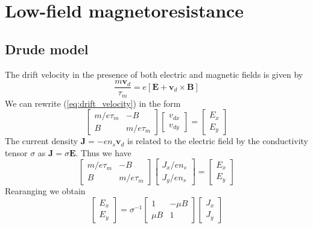 \documentclass[11pt,a4paper]{book}
\theoremstyle{plain}
\theoremstyle{definition}
\theoremstyle{remark}
\renewcommand{\vec}[1]{\boldsymbol{#1}}
\begin{document}
\section{Low-field magnetoresistance}
\subsection{Drude model}
The drift velocity in the presence of both electric and magnetic fields is given by
\begin{equation} \label{eq:drift_velocity}
    \frac{m\vec{v}_d}{\tau_m} = e\left[\vec{E} + \vec{v}_d \times \vec{B}\right]
\end{equation}
We can rewrite (\ref{eq:drift_velocity}) in the form
\begin{equation}
    \begin{bmatrix}
        m/e\tau_m & -B \\
        B & m/e\tau_m
    \end{bmatrix}
    \begin{bmatrix}
        v_{dx} \\ v_{dy}
    \end{bmatrix}
    =
    \begin{bmatrix}
        E_x \\ E_y
    \end{bmatrix}
\end{equation}
The current density $\vec{J} = -e n_s \vec{v}_d$ is related to the electric field by the conductivity tensor $\sigma$ as $\vec{J} = \sigma \vec{E}$. Thus we have
\begin{equation}
    \begin{bmatrix}
        m/e\tau_m & -B \\
        B & m/e\tau_m
    \end{bmatrix}
    \begin{bmatrix}
        J_x/e n_s \\ J_y/e n_s
    \end{bmatrix}
    =
    \begin{bmatrix}
        E_x \\ E_y
    \end{bmatrix}
\end{equation}
Rearanging we obtain
\begin{equation}
    \begin{bmatrix}
        E_x \\ E_y
    \end{bmatrix}
    =
    \sigma^{-1}
    \begin{bmatrix}
        1 & -\mu B \\
        \mu B & 1
    \end{bmatrix}
    \begin{bmatrix}
        J_x \\ J_y
    \end{bmatrix}
\end{equation}
\end{document}
